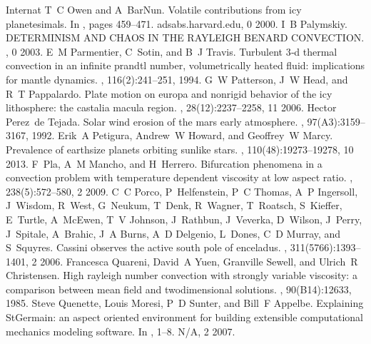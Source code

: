 \documentclass[letterpaper,10pt,english]{jupyterBook}
\begin{document}
\begin{sphinxthebibliography}{Internat}
\sphinxAtStartPar
T C Owen and A Bar\sphinxhyphen{}Nun. Volatile contributions from icy planetesimals. In , pages 459–471. adsabs.harvard.edu, 0 2000.
\sphinxAtStartPar
I B Palymskiy. DETERMINISM AND CHAOS IN THE RAYLEIGH \sphinxhyphen{} BENARD CONVECTION. , 0 2003.
\sphinxAtStartPar
E M Parmentier, C Sotin, and B J Travis. Turbulent 3‐d thermal convection in an infinite prandtl number, volumetrically heated fluid: implications for mantle dynamics. , 116(2):241–251, 1994.
\sphinxAtStartPar
G W Patterson, J W Head, and R T Pappalardo. Plate motion on europa and nonrigid behavior of the icy lithosphere: the castalia macula region. , 28(12):2237–2258, 11 2006.
\sphinxAtStartPar
Hector Perez de Tejada. Solar wind erosion of the mars early atmosphere. , 97(A3):3159–3167, 1992.
\sphinxAtStartPar
Erik A Petigura, Andrew W Howard, and Geoffrey W Marcy. Prevalence of earth\sphinxhyphen{}size planets orbiting sun\sphinxhyphen{}like stars. , 110(48):19273–19278, 10 2013.
\sphinxAtStartPar
F Pla, A M Mancho, and H Herrero. Bifurcation phenomena in a convection problem with temperature dependent viscosity at low aspect ratio. , 238(5):572–580, 2 2009.
\sphinxAtStartPar
C C Porco, P Helfenstein, P C Thomas, A P Ingersoll, J Wisdom, R West, G Neukum, T Denk, R Wagner, T Roatsch, S Kieffer, E Turtle, A McEwen, T V Johnson, J Rathbun, J Veverka, D Wilson, J Perry, J Spitale, A Brahic, J A Burns, A D Delgenio, L Dones, C D Murray, and S Squyres. Cassini observes the active south pole of enceladus. , 311(5766):1393–1401, 2 2006.
\sphinxAtStartPar
Francesca Quareni, David A Yuen, Granville Sewell, and Ulrich R Christensen. High rayleigh number convection with strongly variable viscosity: a comparison between mean field and two\sphinxhyphen{}dimensional solutions. , 90(B14):12633, 1985.
\sphinxAtStartPar
Steve Quenette, Louis Moresi, P D Sunter, and Bill F Appelbe. Explaining StGermain: an aspect oriented environment for building extensible computational mechanics modeling software. In , 1–8. N/A, 2 2007.

\end{sphinxthebibliography}
\end{document}
